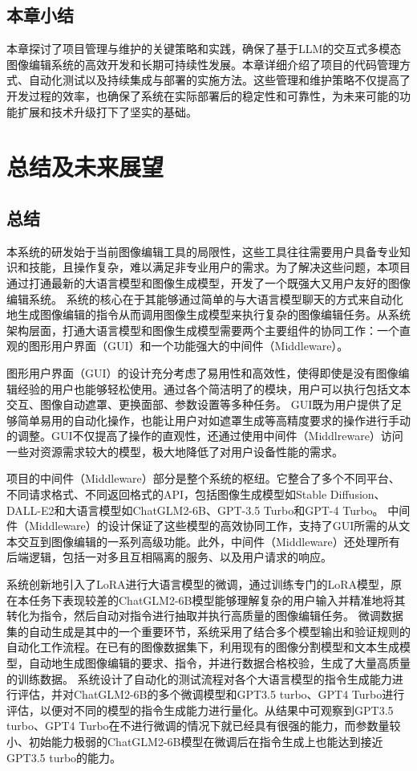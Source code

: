 \documentclass[a4paper,AutoFakeBold,oneside,12pt]{book}
\begin{document}
\section{本章小结}
本章探讨了项目管理与维护的关键策略和实践，确保了基于LLM的交互式多模态图像编辑系统的高效开发和长期可持续性发展。本章详细介绍了项目的代码管理方式、自动化测试以及持续集成与部署的实施方法。这些管理和维护策略不仅提高了开发过程的效率，也确保了系统在实际部署后的稳定性和可靠性，为未来可能的功能扩展和技术升级打下了坚实的基础。

\chapter{总结及未来展望} %
\section{总结}
本系统的研发始于当前图像编辑工具的局限性，这些工具往往需要用户具备专业知识和技能，且操作复杂，难以满足非专业用户的需求。为了解决这些问题，本项目通过打通最新的大语言模型和图像生成模型，开发了一个既强大又用户友好的图像编辑系统。
系统的核心在于其能够通过简单的与大语言模型聊天的方式来自动化地生成图像编辑的指令从而调用图像生成模型来执行复杂的图像编辑任务。从系统架构层面，打通大语言模型和图像生成模型需要两个主要组件的协同工作：一个直观的图形用户界面（GUI）和一个功能强大的中间件（Middleware）。

图形用户界面（GUI）的设计充分考虑了易用性和高效性，使得即使是没有图像编辑经验的用户也能够轻松使用。通过各个简洁明了的模块，用户可以执行包括文本交互、图像自动遮罩、更换面部、参数设置等多种任务。
GUI既为用户提供了足够简单易用的自动化操作，也能让用户对如遮罩生成等高精度要求的操作进行手动的调整。GUI不仅提高了操作的直观性，还通过使用中间件（Middlreware）访问一些对资源需求较大的模型，极大地降低了对用户设备性能的需求。

项目的中间件（Middleware）部分是整个系统的枢纽。它整合了多个不同平台、不同请求格式、不同返回格式的API，包括图像生成模型如Stable Diffusion、DALL-E2和大语言模型如ChatGLM2-6B、GPT-3.5 Turbo和GPT-4 Turbo。
中间件（Middleware）的设计保证了这些模型的高效协同工作，支持了GUI所需的从文本交互到图像编辑的一系列高级功能。此外，中间件（Middleware）还处理所有后端逻辑，包括一对多且互相隔离的服务、以及用户请求的响应。

系统创新地引入了LoRA进行大语言模型的微调，通过训练专门的LoRA模型，原在本任务下表现较差的ChatGLM2-6B模型能够理解复杂的用户输入并精准地将其转化为指令，然后自动对指令进行抽取并执行高质量的图像编辑任务。
微调数据集的自动生成是其中的一个重要环节，系统采用了结合多个模型输出和验证规则的自动化工作流程。在已有的图像数据集下，利用现有的图像分割模型和文本生成模型，自动地生成图像编辑的要求、指令，并进行数据合格校验，生成了大量高质量的训练数据。
系统设计了自动化的测试流程对各个大语言模型的指令生成能力进行评估，并对ChatGLM2-6B的多个微调模型和GPT3.5 turbo、GPT4 Turbo进行评估，以便对不同的模型的指令生成能力进行量化。从结果中可观察到GPT3.5 turbo、GPT4 Turbo在不进行微调的情况下就已经具有很强的能力，而参数量较小、初始能力极弱的ChatGLM2-6B模型在微调后在指令生成上也能达到接近GPT3.5 turbo的能力。
\end{document}
